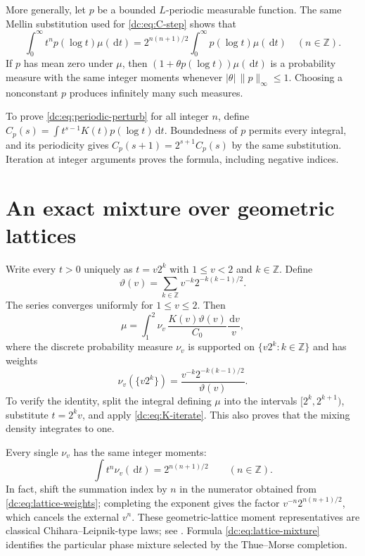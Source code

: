 \documentclass[11pt,a4paper,oneside,openany]{book}
\numberwithin{equation}{chapter}
\theoremstyle{definition}
\theoremstyle{remark}
\newcommand{\Z}{\mathbb Z}
\newcommand{\dd}{\,\mathrm d}
\newcommand{\abs}[1]{\left\lvert #1\right\rvert}
\begin{document}
More generally, let $p$ be a bounded $L$-periodic measurable function.
The same Mellin substitution used for \cref{dc:eq:C-step} shows that
\begin{equation}
 \int_0^\infty t^n p(\log t)\mu(\dd t)
 =2^{n(n+1)/2}\int_0^\infty p(\log t)\mu(\dd t)
 \quad(n\in\Z).
 \label{dc:eq:periodic-perturb}
\end{equation}
If $p$ has mean zero under $\mu$, then
$(1+\theta p(\log t))\mu(\dd t)$ is a probability measure with the
same integer moments whenever $\abs\theta\,\|p\|_\infty\le1$.
Choosing a nonconstant $p$ produces infinitely many such measures.

To prove \cref{dc:eq:periodic-perturb} for all integer $n$, define
$C_p(s)=\int t^{s-1}K(t)p(\log t)\dd t$. Boundedness of $p$
permits every integral, and its periodicity gives
$C_p(s+1)=2^{s+1}C_p(s)$ by the same substitution. Iteration at
integer arguments proves the formula, including negative indices.

\section{An exact mixture over geometric lattices}
Write every $t>0$ uniquely as $t=v2^k$ with $1\le v<2$ and
$k\in\Z$. Define
\begin{equation}
 \vartheta(v)=\sum_{k\in\Z}v^{-k}2^{-k(k-1)/2}.
 \label{dc:eq:Theta}
\end{equation}
The series converges uniformly for $1\le v\le2$. Then
\begin{equation}
 \mu=\int_1^2 \nu_v\,
        \frac{K(v)\vartheta(v)}{C_0}\frac{\dd v}{v},
 \label{dc:eq:lattice-mixture}
\end{equation}
where the discrete probability measure $\nu_v$ is supported on
$\{v2^k:k\in\Z\}$ and has weights
\begin{equation}
 \nu_v(\{v2^k\})=
 \frac{v^{-k}2^{-k(k-1)/2}}{\vartheta(v)}.
 \label{dc:eq:lattice-weights}
\end{equation}
To verify the identity, split the integral defining $\mu$ into the
intervals $[2^k,2^{k+1})$, substitute $t=2^kv$, and apply
\cref{dc:eq:K-iterate}. This also proves that the mixing density
integrates to one.

Every single $\nu_v$ has the same integer moments:
\begin{equation}
 \int t^n\nu_v(\dd t)=2^{n(n+1)/2}
 \qquad(n\in\Z).
 \label{dc:eq:lattice-moments}
\end{equation}
In fact, shift the summation index by $n$ in the numerator obtained
from \cref{dc:eq:lattice-weights}; completing the exponent gives the
factor $v^{-n}2^{n(n+1)/2}$, which cancels the external $v^n$.
These geometric-lattice moment representatives are classical
Chihara--Leipnik-type laws; see \cite{agk}. Formula
\cref{dc:eq:lattice-mixture} identifies the particular phase mixture
selected by the Thue--Morse completion.
\end{document}
